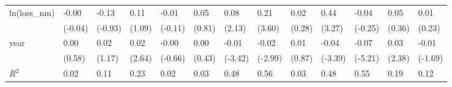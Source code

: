 \begin{tabular}{p{1.5cm} p{1.7cm} p{1.7cm} p{1.7cm}  p{1.7cm} p{1.7cm} p{1.7cm} p{1.7cm} p{1.7cm}  p{1.7cm} p{1.7cm} p{1.7cm} p{1.7cm} }
\hline
ln(loss\_nm)     &    -0.00         &    -0.13         &     0.11         &    -0.01         &     0.05         &     0.08\sym{*}  &     0.21\sym{**} &     0.02         &     0.44\sym{**} &    -0.04         &     0.05         &     0.01         \\
                &  (-0.04)         &  (-0.93)         &   (1.09)         &  (-0.11)         &   (0.81)         &   (2.13)         &   (3.60)         &   (0.28)         &   (3.27)         &  (-0.25)         &   (0.36)         &   (0.23)         \\
year            &     0.00         &     0.02         &     0.02\sym{*}  &    -0.00         &     0.00         &    -0.01\sym{**} &    -0.02\sym{**} &     0.01         &    -0.04\sym{**} &    -0.07\sym{***}&     0.03\sym{*}  &    -0.01         \\
                &   (0.58)         &   (1.17)         &   (2.64)         &  (-0.66)         &   (0.43)         &  (-3.42)         &  (-2.99)         &   (0.87)         &  (-3.39)         &  (-5.21)         &   (2.38)         &  (-1.69)         \\
\hline
\(R^{2}\)       &     0.02         &     0.11         &     0.23         &     0.02         &     0.03         &     0.48         &     0.56         &     0.03         &     0.48         &     0.55         &     0.19         &     0.12         \\
\end{tabular}
